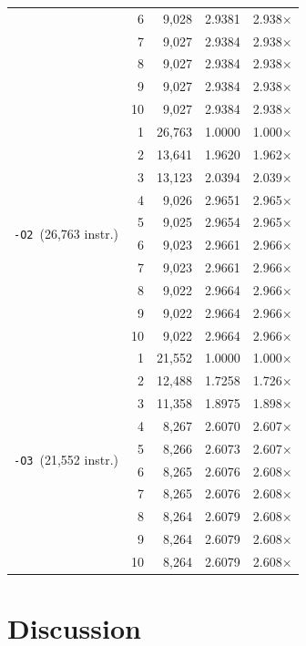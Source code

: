 \documentclass[11pt]{article}
\begin{document}
\begin{table}[htbp]
\begin{tabular}{cr rrr}
 & 6  & 9{,}028  & 2.9381 & 2.938$\times$ \\
 & 7  & 9{,}027  & 2.9384 & 2.938$\times$ \\
 & 8  & 9{,}027  & 2.9384 & 2.938$\times$ \\
 & 9  & 9{,}027  & 2.9384 & 2.938$\times$ \\
 & 10 & 9{,}027  & 2.9384 & 2.938$\times$ \\
\midrule
\multirow{10}{*}{\texttt{-O2}\ (26{,}763 instr.)}
 & 1  & 26{,}763 & 1.0000 & 1.000$\times$ \\
 & 2  & 13{,}641 & 1.9620 & 1.962$\times$ \\
 & 3  & 13{,}123 & 2.0394 & 2.039$\times$ \\
 & 4  & 9{,}026  & 2.9651 & 2.965$\times$ \\
 & 5  & 9{,}025  & 2.9654 & 2.965$\times$ \\
 & 6  & 9{,}023  & 2.9661 & 2.966$\times$ \\
 & 7  & 9{,}023  & 2.9661 & 2.966$\times$ \\
 & 8  & 9{,}022  & 2.9664 & 2.966$\times$ \\
 & 9  & 9{,}022  & 2.9664 & 2.966$\times$ \\
 & 10 & 9{,}022  & 2.9664 & 2.966$\times$ \\
\midrule
\multirow{10}{*}{\texttt{-O3}\ (21{,}552 instr.)}
 & 1  & 21{,}552 & 1.0000 & 1.000$\times$ \\
 & 2  & 12{,}488 & 1.7258 & 1.726$\times$ \\
 & 3  & 11{,}358 & 1.8975 & 1.898$\times$ \\
 & 4  & 8{,}267  & 2.6070 & 2.607$\times$ \\
 & 5  & 8{,}266  & 2.6073 & 2.607$\times$ \\
 & 6  & 8{,}265  & 2.6076 & 2.608$\times$ \\
 & 7  & 8{,}265  & 2.6076 & 2.608$\times$ \\
 & 8  & 8{,}264  & 2.6079 & 2.608$\times$ \\
 & 9  & 8{,}264  & 2.6079 & 2.608$\times$ \\
 & 10 & 8{,}264  & 2.6079 & 2.608$\times$ \\
\bottomrule
\end{tabular}
\end{table}

\clearpage
\section{Discussion}
\label{sec:discussion}
\end{document}
